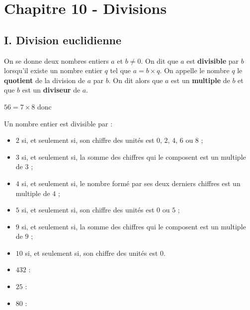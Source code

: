 
\section*{Chapitre 10 - Divisions}

\subsection*{I. Division euclidienne}

\begin{Définition*}
On se donne deux nombres entiers $a$ et $b \neq 0$. On dit que $a$ est \textbf{divisible} par $b$ lorsqu'il existe un nombre entier $q$ tel que $a = b \times q$. On appelle le nombre $q$ le \textbf{quotient} de la division de $a$ par $b$. On dit alors que $a$ est un \textbf{multiple} de $b$ et que $b$ est un \textbf{diviseur} de $a$.
\end{Définition*}

\begin{Exemple}
$56 = 7 \times 8$ donc \ligne

\ligne

\end{Exemple}

\begin{Propriété}[c] Un nombre entier est divisible par :

\begin{itemize}[label=\textcolor{Couleur1}{$\bullet$}]
\item $2$ si, et seulement si, son chiffre des unités est $0$, $2$, $4$, $6$ ou $8$ ;
\item $3$ si, et seulement si, la somme des chiffres qui le composent est un multiple de $3$ ;
\item $4$ si, et seulement si, le nombre formé par ses deux derniers chiffres est un multiple de $4$ ;
\item $5$ si, et seulement si, son chiffre des unités est $0$ ou $5$ ;
\item $9$ si, et seulement si, la somme des chiffres qui le composent est un multiple de $9$ ;
\item $10$ si, et seulement si, son chiffre des unités est $0$.
\end{itemize}
\end{Propriété}

\begin{Exemples}
\begin{itemize}[label=\textcolor{Couleur8}{$\bullet$}]
\item $432$ : \ligne

\ligne

\ligne

\item $25$ : \ligne

\item $80$ : \ligne

\end{itemize}
\end{Exemples}

